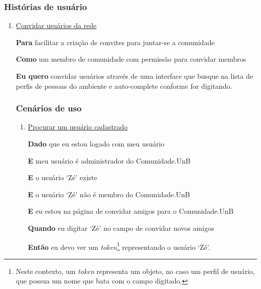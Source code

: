 \subsubsection*{Histórias de usuário}

\begin{enumerate}

\item \underline{Convidar usuários da rede}

	\textbf{Para} facilitar a criação de convites para juntar-se a comunidade

	\textbf{Como} um membro de comunidade com permissão para convidar membros

	\textbf{Eu quero} convidar usuários através de uma interface que busque na lista
	de perfis de pessoas do ambiente e auto-complete conforme for digitando.

\subsubsection*{Cenários de uso}

	\begin{enumerate}

		\item \underline{Procurar um usuário cadastrado}

		\textbf{Dado} que eu estou logado com meu usuário

		\textbf{E} meu usuário é administrador do Comunidade.UnB

		\textbf{E} o usuário `Zé' existe

		\textbf{E} o usuário `Zé' não é membro do Comunidade.UnB

		\textbf{E} eu estou na página de convidar amigos para o Comunidade.UnB

		\textbf{Quando} eu digitar `Zé' no campo de convidar novos amigos

		\textbf{Então} eu devo ver um \textit{token}\footnote{Neste contexto, um
		\textit{token} representa um objeto, no caso um perfil de usuário, que possua
		um nome que bata com o campo digitado.} representando o usuário `Zé'.

	\end{enumerate}


\end{enumerate}


